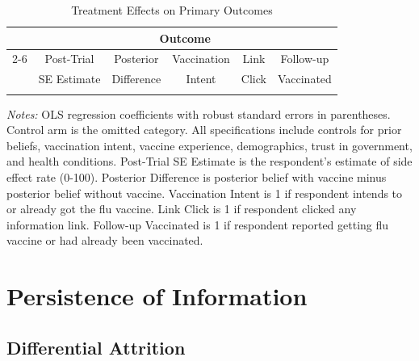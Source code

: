 \documentclass[11pt]{article}
\begin{document}
\begin{table}[H]
\caption{Treatment Effects on Primary Outcomes}
\label{tab:treatment_effects}
\centering
\begin{tabular}{lccccc}
\toprule
& \multicolumn{5}{c}{Outcome} \\
\cmidrule(lr){2-6}
& Post-Trial & Posterior & Vaccination & Link & Follow-up \\
& SE Estimate & Difference & Intent & Click & Vaccinated \\
\midrule

\\
\bottomrule
\end{tabular}
\begin{minipage}{\textwidth}
\vspace{0.5em}
\footnotesize
\textit{Notes:} OLS regression coefficients with robust standard errors in parentheses. Control arm is the omitted category. All specifications include controls for prior beliefs, vaccination intent, vaccine experience, demographics, trust in government, and health conditions. Post-Trial SE Estimate is the respondent's estimate of side effect rate (0-100). Posterior Difference is posterior belief with vaccine minus posterior belief without vaccine. Vaccination Intent is 1 if respondent intends to or already got the flu vaccine. Link Click is 1 if respondent clicked any information link. Follow-up Vaccinated is 1 if respondent reported getting flu vaccine or had already been vaccinated.
\end{minipage}
\end{table}

\section{Persistence of Information}

\subsection{Differential Attrition}
\end{document}
